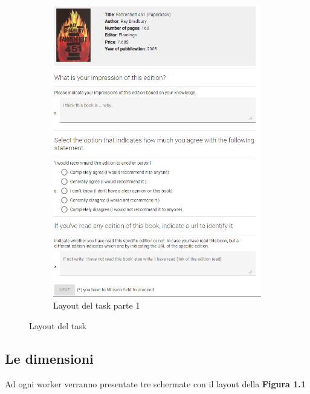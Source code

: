 \documentclass[a4paper,11pt]{report}
\begin{document}
\begin{figure}[H]
\begin{subfigure}{.49\textwidth}
		\includegraphics[width=1\linewidth]{task_p2}
		\caption{Layout del task parte 1}
		\label{fig:taskparte2}
	\end{subfigure}%
\caption{Layout del task}
\label{fig:layout}
\end{figure}
\subsection{Le dimensioni}

Ad ogni worker verranno presentate tre schermate con il layout della \textbf{Figura 1.1}
\pagebreak
\end{document}
